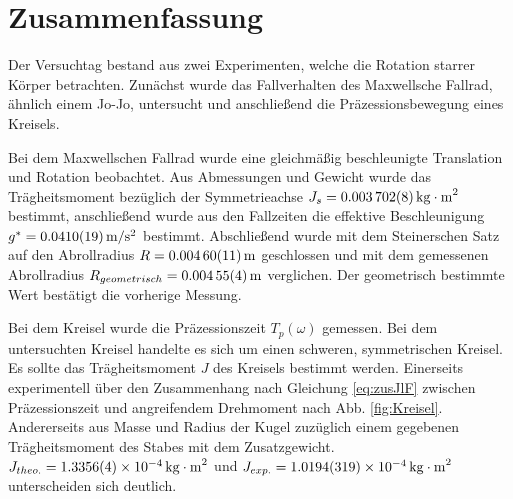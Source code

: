 
\section{Zusammenfassung}\label{kap:Zusammenfassung}

Der Versuchtag bestand aus zwei Experimenten, welche die Rotation starrer Körper betrachten. Zunächst wurde das Fallverhalten des Maxwellsche Fallrad, ähnlich einem Jo-Jo, untersucht und anschließend die Präzessionsbewegung eines Kreisels. 



Bei dem Maxwellschen Fallrad wurde eine gleichmäßig beschleunigte Translation und Rotation beobachtet.
Aus Abmessungen und Gewicht wurde das Trägheitsmoment bezüglich der Symmetrieachse $J_s=\SI{0.003702 \pm 0.000008}{kg\cdot m^2}$ bestimmt, anschließend wurde aus den Fallzeiten die effektive Beschleunigung  $g^*=\SI{0.0410 \pm  0.0019}{m \per s \squared}$ bestimmt. Abschließend wurde mit dem Steinerschen Satz auf den Abrollradius $R=\SI{0.00460\pm 0.00011}{m}$ geschlossen und mit dem gemessenen Abrollradius $R_{geometrisch}=\SI{0.00455 \pm 0.00004}{m}$ verglichen. Der geometrisch bestimmte Wert bestätigt die vorherige Messung. 







Bei dem Kreisel wurde die Präzessionszeit $T_p(\omega)$ gemessen. Bei dem untersuchten Kreisel handelte es sich um einen schweren, symmetrischen Kreisel.
Es sollte das Trägheitsmoment $J$ des Kreisels bestimmt werden. Einerseits experimentell über den Zusammenhang nach Gleichung \ref{eq:zusJlF} zwischen Präzessionszeit und angreifendem Drehmoment nach Abb. \ref{fig:Kreisel}.
Andererseits aus Masse und Radius der Kugel zuzüglich einem gegebenen Trägheitsmoment des Stabes mit dem Zusatzgewicht. $J_{theo.}=\SI{1,3356+-0,0004e-4}{kg \cdot m^2}$ und $J_{exp.}=\SI{1,0194+-0,0319e-4}{kg \cdot m^2}$ unterscheiden sich deutlich.  
 








